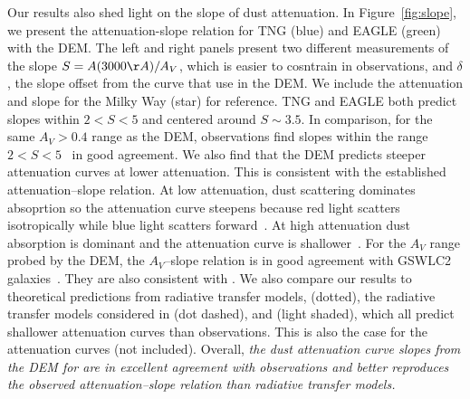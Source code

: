 Our results also shed light on the slope of dust attenuation. In Figure~\ref{fig:slope}, 
we present the attenuation-slope relation for TNG (blue) and EAGLE (green) with the DEM.
The left and right panels present two different measurements of the slope $S =
A(3000\AA)/A_V$, which is easier to cosntrain in observations, and $\delta$,
the slope offset from the \cite{calzetti2001} curve that use in the DEM. 
We include the attenuation and slope for the Milky Way (star) for reference.
TNG and EAGLE both predict slopes within $2 < S < 5$ and centered around $S\sim
3.5$. In comparison, for the same $A_V > 0.4$ range as the DEM, observations 
find slopes within the range $2 < S < 5$~\citep{calzetti2000, burgarella2005, johnson2007,
conroy2010, wild2011, battisti2016, battisti2017, ljea2017, salim2018} in good
agreement. We also find that the DEM predicts steeper attenuation curves at 
lower attenuation. This is consistent with the established attenuation--slope
relation. At low attenuation, dust scattering dominates absoprtion so the 
attenuation curve steepens because red light scatters isotropically while blue light
scatters forward~\citep{gordon1994, witt2000, draine2003}. %
At high attenuation dust absorption is dominant and the attenuation curve is
shallower~\citep{chevallard2013}. For the $A_V$ range probed by the DEM, the
$A_V$--slope relation is in good agreement with GSWLC2 galaxies~\citep[black shaded][]{salim2020}.
They are also consistent with \cite{leja2017}. We also compare our results to
theoretical predictions from radiative transfer models, \cite{inoue2005}
(dotted), the radiative transfer models considered in \cite{chevallard2013}
(dot dashed), and \cite{trayford2020} (light shaded), which all predict shallower 
attenuation curves than observations. This is also the case for the
\cite{narayanan2018} attenuation curves (not included). 
Overall, \emph{the dust attenuation curve slopes from the DEM for are in
excellent agreement with observations and better reproduces the observed
attenuation--slope relation than radiative transfer models.}



